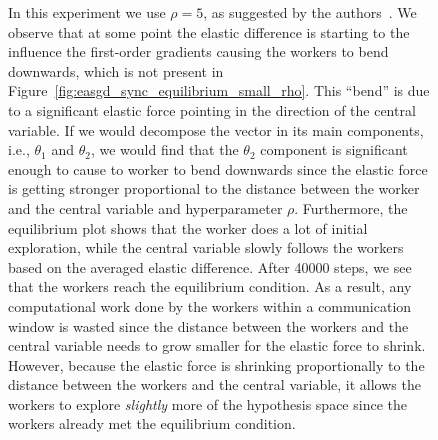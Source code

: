 \begin{figure}[H]
  \caption{In this experiment we use $\rho = 5$, as suggested by the authors~\cite{zhang2015deep}. We observe that at some point the elastic difference is starting to the influence the first-order gradients causing the workers to bend downwards, which is not present in Figure~\ref{fig:easgd_sync_equilibrium_small_rho}. This ``bend'' is due to a significant elastic force pointing in the direction of the central variable. If we would decompose the vector in its main components, i.e., $\theta_1$ and $\theta_2$, we would find that the $\theta_2$ component is significant enough to cause to worker to bend downwards since the elastic force is getting stronger proportional to the distance between the worker and the central variable and hyperparameter $\rho$. Furthermore, the equilibrium plot shows that the worker does a lot of initial exploration, while the central variable slowly follows the workers based on the averaged elastic difference. After 40000 steps, we see that the workers reach the equilibrium condition. As a result, any computational work done by the workers within a communication window is wasted since the distance between the workers and the central variable needs to grow smaller for the elastic force to shrink. However, because the elastic force is shrinking proportionally to the distance between the workers and the central variable, it allows the workers to explore \emph{slightly} more of the hypothesis space since the workers already met the equilibrium condition.}
  \label{fig:easgd_sync_equilibrium}
\end{figure}

